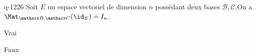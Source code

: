 \begin{truefalse}{q-1226}
Soit $E$ un espace vectoriel de dimension $n$ possédant deux bases $\mathscr B, \mathscr C$.\newline  On a $\Mat_{\mathscr B,\mathscr C}(\id_E) = I_n$.
\item Vrai
\item* Faux
\end{truefalse}

